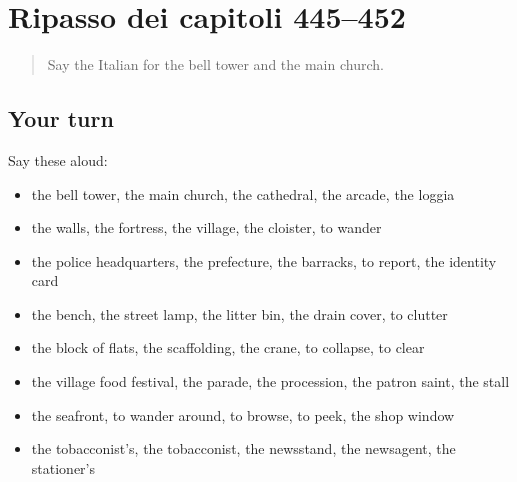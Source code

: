 \section[(dialogue)]{Ripasso dei capitoli 445–452}

\label{lesson:IT-R452-ripasso-445-452}



\begin{quote}
Say the Italian for the bell tower and the main church.
\end{quote}

\subsection*{Your turn}
Say these aloud:

\begin{itemize}
\raggedright
  \item the bell tower, the main church, the cathedral, the arcade, the loggia
  \item the walls, the fortress, the village, the cloister, to wander
  \item the police headquarters, the prefecture, the barracks, to report, the identity card
  \item the bench, the street lamp, the litter bin, the drain cover, to clutter
  \item the block of flats, the scaffolding, the crane, to collapse, to clear
  \item the village food festival, the parade, the procession, the patron saint, the stall
  \item the seafront, to wander around, to browse, to peek, the shop window
  \item the tobacconist's, the tobacconist, the newsstand, the newsagent, the stationer's
\end{itemize}

